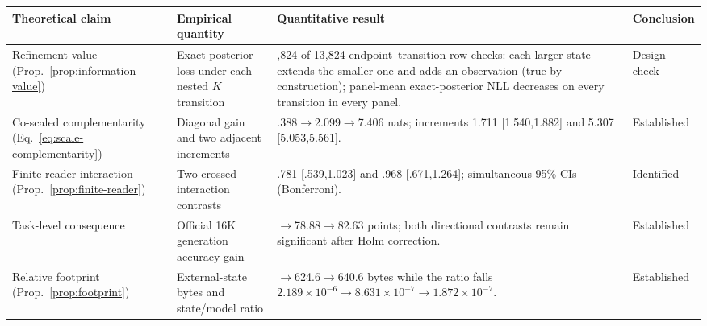 \begin{tabular}{>{\raggedright\arraybackslash}p{}>{\raggedright\arraybackslash}p{}>{\raggedright\arraybackslash}p{}>{\raggedright\arraybackslash}p{}}
\toprule
Theoretical claim & Empirical quantity & Quantitative result & Conclusion \\
\midrule
Refinement value (Prop.~\ref{prop:information-value}) & Exact-posterior loss under each nested $K$ transition & 13,824 of 13,824 endpoint--transition row checks: each larger state extends the smaller one and adds an observation (true by construction); panel-mean exact-posterior NLL decreases on every transition in every panel. & Design check\footnotemark[1] \\
Co-scaled complementarity (Eq.~\ref{eq:scale-complementarity}) & Diagonal gain and two adjacent increments & .388$\to$2.099$\to$7.406 nats; increments 1.711 [1.540,1.882] and 5.307 [5.053,5.561]. & Established \\
Finite-reader interaction (Prop.~\ref{prop:finite-reader}) & Two crossed interaction contrasts & .781 [.539,1.023] and .968 [.671,1.264]; simultaneous 95\% CIs (Bonferroni). & Identified \\
Task-level consequence & Official 16K generation accuracy gain & 10.50$\to$78.88$\to$82.63 points; both directional contrasts remain significant after Holm correction. & Established \\
Relative footprint (Prop.~\ref{prop:footprint}) & External-state bytes and state/model ratio & 589.0$\to$624.6$\to$640.6 bytes while the ratio falls $2.189\!\times\!10^{-6}\to8.631\!\times\!10^{-7}\to1.872\!\times\!10^{-7}$. & Established \\
\bottomrule
\end{tabular}

